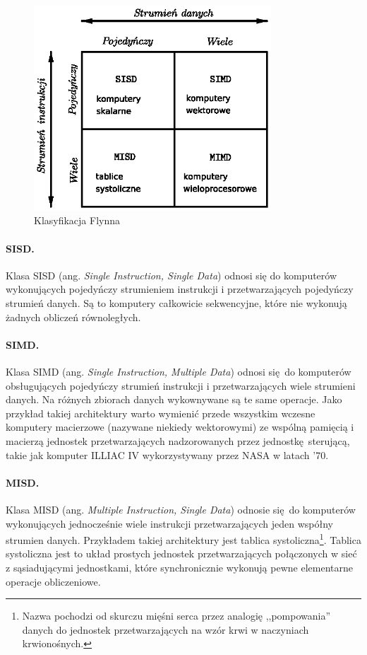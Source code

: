 \begin{figure}
\centering
\includegraphics[width=24em]{images/flynn.eps}
\caption{Klasyfikacja Flynna}
\label{fig:flynn}
\end{figure}

\paragraph{SISD.}
Klasa SISD (ang. \emph{Single Instruction, Single Data}) odnosi się do komputerów wykonujących pojedyńczy strumieniem instrukcji i przetwarzających pojedyńczy strumień danych. Są to komputery całkowicie sekwencyjne, które nie wykonują żadnych obliczeń równoległych.
\paragraph{SIMD.}
Klasa SIMD (ang. \emph{Single Instruction, Multiple Data}) odnosi się do komputerów obsługujących pojedyńczy strumień instrukcji i przetwarzających wiele strumieni danych. Na różnych zbiorach danych wykownywane są te same operacje. Jako przykład takiej architektury warto wymienić przede wszystkim wczesne komputery macierzowe (nazywane niekiedy wektorowymi) ze wspólną pamięcią i macierzą jednostek przetwarzających nadzorowanych przez jednostkę sterującą, takie jak komputer ILLIAC IV wykorzystywany przez NASA w latach '70.
\paragraph{MISD.}
Klasa MISD (ang. \emph{Multiple Instruction, Single Data}) 
odnosie się do komputerów wykonujących jednocześnie wiele instrukcji przetwarzających jeden współny strumien danych. Przykładem takiej architektury jest tablica systoliczna\footnote{Nazwa pochodzi od skurczu mięśni serca przez analogię ,,pompowania'' danych do jednostek przetwarzających na wzór krwi w naczyniach krwionośnych.}. Tablica systoliczna jest to układ prostych jednostek przetwarzających połączonych w sieć z sąsiadującymi jednostkami, które synchronicznie wykonują pewne elementarne operacje obliczeniowe.

